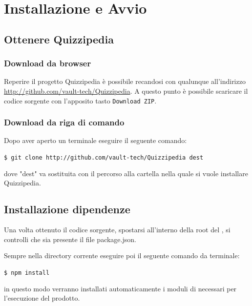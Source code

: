 \documentclass[a4paper, titlepage]{article}
\begin{document}
	\section{Installazione e Avvio}
	
	\subsection{Ottenere Quizzipedia}
	\subsubsection{Download da browser}
	Reperire il progetto Quizzipedia è possibile recandosi con qualunque  all'indirizzo \url{http://github.com/vault-tech/Quizzipedia}.
	A questo punto è possibile scaricare il codice sorgente con l'apposito tasto \texttt{Download ZIP}.

	\subsubsection{Download da riga di comando}
	Dopo aver aperto un terminale eseguire il seguente comando:

	\texttt{\$ git clone http://github.com/vault-tech/Quizzipedia dest}

	dove "dest" va sostituita con il percorso alla cartella nella quale si vuole installare Quizzipedia.

	\subsection{Installazione dipendenze}
	
	Una volta ottenuto il codice sorgente, spostarsi all'interno della root del , si controlli che sia presente il file package.json.
	
	Sempre nella directory corrente eseguire poi il seguente comando da terminale:
	
	\texttt{\$ npm install}
	
	in questo modo verranno installati automaticamente i moduli di  necessari per l'esecuzione del prodotto.
	
\end{document}
